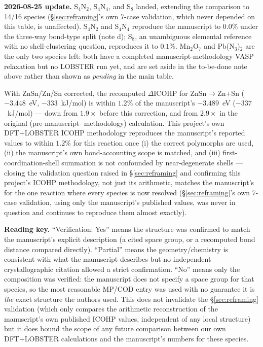 \textbf{2026-08-25 update.} S$_4$N$_2$, S$_4$N$_4$, and S$_8$ landed,
extending the comparison to 14/16 species (\S\ref{sec:reframing}'s own
7-case validation, which never depended on this table, is unaffected).
S$_4$N$_2$ and S$_4$N$_4$ reproduce the manuscript to $0.0\%$ under the
three-way bond-type split (note d); S$_8$, an unambiguous elemental
reference with no shell-clustering question, reproduces it to $0.1\%$.
Mn$_2$O$_7$ and Pb(N$_3$)$_2$ are the only two species left: both have
a completed manuscript-methodology VASP relaxation but no LOBSTER run
yet, and are set aside in the to-be-done note above rather than shown
as \emph{pending} in the main table.

With ZnSn/Zn/Sn corrected, the recomputed $\Delta$ICOHP for
ZnSn$\to$Zn+Sn ($-3.448$~eV, $-333$~kJ/mol) is within $1.2\%$ of the
manuscript's $-3.489$~eV ($-337$~kJ/mol) --- down from $1.9\times$ before
this correction, and from $2.9\times$ in the original (pre-manuscript-
methodology) calculation. This project's own DFT+LOBSTER ICOHP
methodology reproduces the manuscript's reported values to within
$1.2\%$ for this reaction once (i) the correct polymorphs are used, (ii)
the manuscript's own bond-accounting scope is matched, and (iii)
first-coordination-shell summation is not confounded by near-degenerate
shells --- closing the validation question raised in
\S\ref{sec:reframing} and confirming this project's ICOHP methodology,
not just its arithmetic, matches the manuscript's for the one reaction
where every species is now resolved (\S\ref{sec:reframing}'s own 7-case
validation, using only the manuscript's published values, was never in
question and continues to reproduce them almost exactly).

\vspace{0.5em}
\noindent\textbf{Reading key.} ``Verification: Yes'' means the structure was confirmed to match the manuscript's explicit description (a cited space group, or a recomputed bond distance compared directly). ``Partial'' means the geometry/chemistry is consistent with what the manuscript describes but no independent crystallographic citation allowed a strict confirmation. ``No'' means only the composition was verified: the manuscript does not specify a space group for that species, so the most reasonable MP/COD entry was used with no guarantee it is \emph{the} exact structure the authors used. This does not invalidate the \S\ref{sec:reframing} validation (which only compares the arithmetic reconstruction of the manuscript's own published ICOHP values, independent of any local structure) but it does bound the scope of any future comparison between our own DFT+LOBSTER calculations and the manuscript's numbers for these species.
